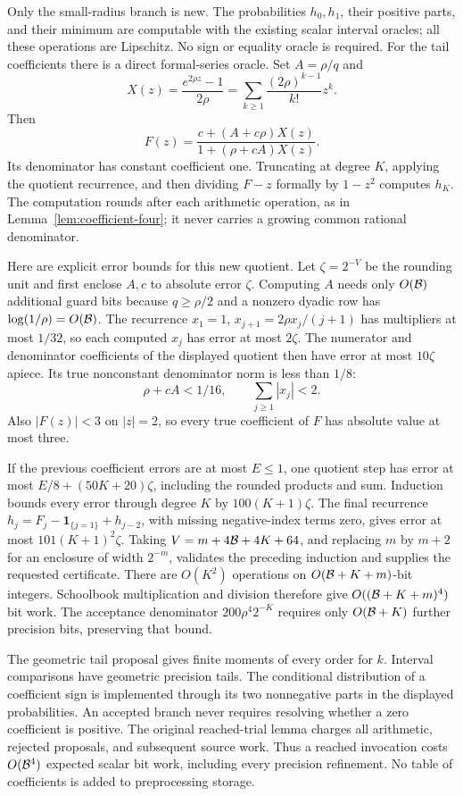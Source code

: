 Only the small-radius branch is new.  The probabilities
\(h_0,h_1\), their positive parts, and their minimum are
computable with the existing scalar interval oracles; all these
operations are Lipschitz.  No sign or equality oracle is required.
For the tail coefficients there is a direct formal-series oracle.
Set \(A=\rho/q\) and
\[
 X(z)=\frac{e^{2\rho z}-1}{2\rho}
      =\sum_{k\ge1}\frac{(2\rho)^{k-1}}{k!}z^k.
\]
Then
\[
 F(z)=\frac{c+(A+c\rho)X(z)}{1+(\rho+cA)X(z)}.
\]
Its denominator has constant coefficient one.  Truncating at
degree \(K\), applying the quotient recurrence, and then
dividing \(F-z\) formally by \(1-z^2\) computes \(h_K\).
The computation rounds after each arithmetic operation, as in
Lemma~\ref{lem:coefficient-four}; it never carries a growing
common rational denominator.

Here are explicit error bounds for this new quotient.  Let
\(\zeta=2^{-V}\) be the rounding unit and first enclose \(A,c\)
to absolute error \(\zeta\).  Computing \(A\) needs only
\(O(\mathcal B)\) additional guard bits because \(q\ge\rho/2\)
and a nonzero dyadic row has \(\log(1/\rho)=O(\mathcal B)\).
The recurrence
\(x_1=1\), \(x_{j+1}=2\rho x_j/(j+1)\)
has multipliers at most \(1/32\), so each computed \(x_j\)
has error at most \(2\zeta\).  The numerator and denominator
coefficients of the displayed quotient then have error at most
\(10\zeta\) apiece.  Its true nonconstant denominator norm
is less than \(1/8\):
\[
 \rho+cA<1/16,\qquad \sum_{j\ge1}|x_j|<2.
\]
Also \(|F(z)|<3\) on \(|z|=2\), so every true coefficient
of \(F\) has absolute value at most three.

If the previous coefficient errors are at most \(E\le1\),
one quotient step has error at most
\(E/8+(50K+20)\zeta\), including the rounded products and
sum.  Induction bounds every error through degree \(K\) by
\(100(K+1)\zeta\).  The final recurrence
\(h_j=F_j-\mathbf1_{\{j=1\}}+h_{j-2}\), with missing
negative-index terms zero, gives error at most
\(101(K+1)^2\zeta\).  Taking
\(V=m+4\mathcal B+4K+64\), and replacing \(m\) by \(m+2\)
for an enclosure of width \(2^{-m}\), validates the preceding
induction and supplies the requested certificate.
There are \(O(K^2)\) operations on
\(O(\mathcal B+K+m)\)-bit integers.  Schoolbook multiplication and
division therefore give \(O((\mathcal B+K+m)^4)\) bit work.
The acceptance denominator \(200\rho^4 2^{-K}\) requires only
\(O(\mathcal B+K)\) further precision bits, preserving that bound.

The geometric tail proposal gives finite moments of every order
for \(k\).  Interval comparisons have geometric precision tails.
The conditional distribution of a coefficient sign is implemented
through its two nonnegative parts in the displayed probabilities.
An accepted branch never requires resolving whether a zero
coefficient is positive.  The original reached-trial lemma charges
all arithmetic, rejected proposals, and subsequent source work.
Thus a reached invocation costs \(O(\mathcal B^4)\) expected scalar
bit work, including every precision refinement.  No table of
coefficients is added to preprocessing storage.
